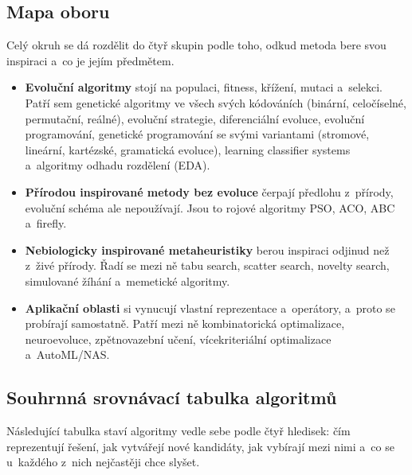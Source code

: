 \documentclass[11pt,a4paper]{article}
\theoremstyle{definition}
\begin{document}
\subsection*{Mapa oboru}

Celý okruh se dá rozdělit do čtyř skupin podle toho, odkud metoda bere svou inspiraci a~co je
jejím předmětem.

\begin{itemize}
\item \textbf{Evoluční algoritmy} stojí na populaci, fitness, křížení, mutaci a~selekci. Patří
  sem genetické algoritmy ve všech svých kódováních (binární, celočíselné, permutační,
  reálné), evoluční strategie, diferenciální evoluce, evoluční programování, genetické
  programování se svými variantami (stromové, lineární, kartézské, gramatická evoluce),
  learning classifier systems a~algoritmy odhadu rozdělení (EDA).
\item \textbf{Přírodou inspirované metody bez evoluce} čerpají předlohu z~přírody, evoluční
  schéma ale nepoužívají. Jsou to rojové algoritmy PSO, ACO, ABC a~firefly.
\item \textbf{Nebiologicky inspirované metaheuristiky} berou inspiraci odjinud než z~živé
  přírody. Řadí se mezi ně tabu search, scatter search, novelty search, simulované žíhání
  a~memetické algoritmy.
\item \textbf{Aplikační oblasti} si vynucují vlastní reprezentace a~operátory, a~proto se
  probírají samostatně. Patří mezi ně kombinatorická optimalizace, neuroevoluce, zpětnovazební
  učení, vícekriteriální optimalizace a~AutoML/NAS.
\end{itemize}

\subsection*{Souhrnná srovnávací tabulka algoritmů}

Následující tabulka staví algoritmy vedle sebe podle čtyř hledisek: čím reprezentují řešení,
jak vytvářejí nové kandidáty, jak vybírají mezi nimi a~co se u~každého z~nich nejčastěji chce
slyšet.
\end{document}
